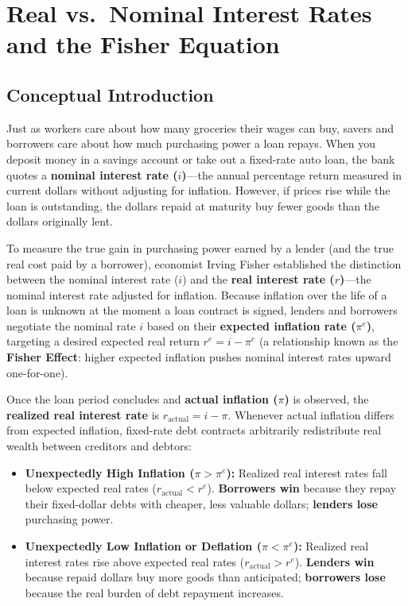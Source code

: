 \documentclass[11pt,letterpaper]{article}
\begin{document}
\section{Real vs.\ Nominal Interest Rates and the Fisher Equation}

\subsection*{Conceptual Introduction}
Just as workers care about how many groceries their wages can buy, savers and borrowers care about how much purchasing power a loan repays. When you deposit money in a savings account or take out a fixed-rate auto loan, the bank quotes a \textbf{nominal interest rate ($i$)}—the annual percentage return measured in current dollars without adjusting for inflation. However, if prices rise while the loan is outstanding, the dollars repaid at maturity buy fewer goods than the dollars originally lent.

To measure the true gain in purchasing power earned by a lender (and the true real cost paid by a borrower), economist Irving Fisher established the distinction between the nominal interest rate ($i$) and the \textbf{real interest rate ($r$)}—the nominal interest rate adjusted for inflation. Because inflation over the life of a loan is unknown at the moment a loan contract is signed, lenders and borrowers negotiate the nominal rate $i$ based on their \textbf{expected inflation rate ($\pi^e$)}, targeting a desired expected real return $r^e = i - \pi^e$ (a relationship known as the \textbf{Fisher Effect}: higher expected inflation pushes nominal interest rates upward one-for-one).

Once the loan period concludes and \textbf{actual inflation ($\pi$)} is observed, the \textbf{realized real interest rate} is $r_{\text{actual}} = i - \pi$. Whenever actual inflation differs from expected inflation, fixed-rate debt contracts arbitrarily redistribute real wealth between creditors and debtors:
\begin{itemize}
    \item \textbf{Unexpectedly High Inflation ($\pi > \pi^e$):} Realized real interest rates fall below expected real rates ($r_{\text{actual}} < r^e$). \textbf{Borrowers win} because they repay their fixed-dollar debts with cheaper, less valuable dollars; \textbf{lenders lose} purchasing power.
    \item \textbf{Unexpectedly Low Inflation or Deflation ($\pi < \pi^e$):} Realized real interest rates rise above expected real rates ($r_{\text{actual}} > r^e$). \textbf{Lenders win} because repaid dollars buy more goods than anticipated; \textbf{borrowers lose} because the real burden of debt repayment increases.
\end{itemize}
\end{document}
